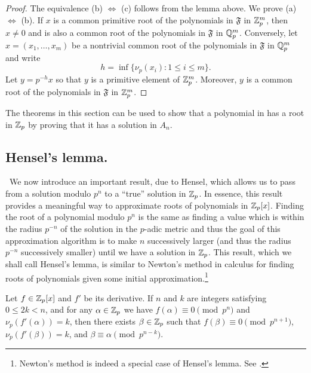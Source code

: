 \begin{proof}
    The equivalence (b) \(\iff\) (c) follows from the lemma above. We prove (a) \(\iff\) (b). If \(x\) is a common primitive root of the polynomials in \(\mathfrak{F}\) in \(\mathbb{Z}_p^m\), then \(x \neq 0\) and is also a common root of the polynomials in \(\mathfrak{F}\) in \(\mathbb{Q}_p^m\). Conversely, let \(x = (x_1, \dots, x_m)\) be a nontrivial common root of the polynomials in \(\mathfrak{F}\) in \(\mathbb{Q}_p^m\) and write
    \[
      h = \inf\{\nu_p(x_i) : 1 \leq i \leq m\}.
    \]
    Let \(y = p^{-h}x\) so that \(y\) is a primitive element of \(\mathbb{Z}_p^m\). Moreover, \(y\) is a common root of the polynomials in \(\mathfrak{F}\) in \(\mathbb{Z}_p^m\).
\end{proof}

The theorems in this section can be used to show that a polynomial in has a root in \(\mathbb{Z}_p\) by proving that it has a solution in \(A_n\). \cite{weismann2006annotations}


\subsection{Hensel's lemma.}~We now introduce an important result, due to Hensel, which allows us to pass from a solution modulo \(p^n\) to a ``true'' solution in \(\mathbb{Z}_p\). In essence, this result provides a meaningful way to approximate roots of polynomials in \(\mathbb{Z}_p[x]\). Finding the root of a polynomial modulo \(p^n\) is the same as finding a value which is within the radius \(p^{-n}\) of the solution in the \(p\)-adic metric \cite{weismann2006annotations} and thus the goal of this approximation algorithm is to make \(n\) successively larger (and thus the radius \(p^{-n}\) successively smaller) until we have a solution in \(\mathbb{Z}_p\). This result, which we shall call Hensel's lemma, is similar to Newton's method in calculus for finding roots of polynomials given some initial approximation.\footnote{Newton's method is indeed a special case of Hensel's lemma. See \cite{von1984hensel}.}

\begin{lemma}
    Let \(f \in \mathbb{Z}_p[x]\) and \(f'\) be its derivative. If \(n\) and \(k\) are integers satisfying \(0 \leq 2k < n\), and for any \(\alpha \in \mathbb{Z}_p\) we have \(f(\alpha) \equiv 0 \pmod{p^n}\) and \(\nu_p(f'(\alpha)) = k\), then there exists \(\beta \in \mathbb{Z}_p\) such that \(f(\beta) \equiv 0 \pmod{p^{n + 1}}\), \(\nu_p(f'(\beta)) = k\), and \(\beta \equiv \alpha \pmod{p^{n-k}}\).
\end{lemma}

